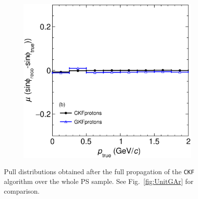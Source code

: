 \begin{figure}[t]
\begin{subfigure}{0.32\textwidth}
         \caption{}
         \label{fig:sinphiBiasVSp211_Int}
     \end{subfigure}
          \begin{subfigure}{0.32\textwidth}
         \centering
         \includegraphics[width=\textwidth]{figures/ch5-KF_NDGAr/FullSample/Int/Angle_Res/sinphi/BiassinphiVSp_2212.eps}
         \caption{}
         \label{fig:sinphiBiasVSp2212_Int}
     \end{subfigure}
        \caption{Pull distributions obtained after the full propagation of the \texttt{CKF} algorithm over the whole PS sample. See Fig.~\ref{fig:UnitGAr} for comparison.}
        \label{fig:sinphiRes2Dp_Int}
\end{figure}


